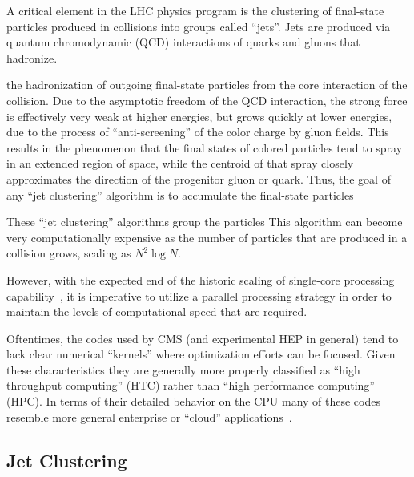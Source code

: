 \documentclass[12pt]{article}
\begin{document}
A critical element in the LHC physics program is the clustering of
final-state particles produced in collisions into groups called
``jets''. Jets are produced via quantum chromodynamic (QCD)
interactions of quarks and gluons that hadronize. 


the hadronization of outgoing final-state particles
from the core interaction of the collision. Due to the asymptotic
freedom of the QCD interaction, the strong force is effectively very
weak at higher energies, but grows quickly at lower energies, due to
the process of ``anti-screening'' of the color charge by gluon
fields. This results in the phenomenon that the final states of
colored particles tend to spray in an extended region of space, while
the centroid of that spray closely approximates the direction of the
progenitor gluon or quark. Thus, the goal of any ``jet clustering''
algorithm is to accumulate the final-state particles 


These ``jet clustering'' algorithms group the particles 
This algorithm can become very computationally expensive as the number
of particles that are produced in a collision grows, scaling as
$N^2\log{N}$. 


However, with the expected end of the historic scaling of single-core
processing capability~\cite{GAMEOVER}, it is imperative to utilize a
parallel processing
strategy in order to maintain the levels of computational speed that
are required.

Oftentimes,
the codes used by CMS (and experimental HEP in general) tend to lack
clear numerical ``kernels'' where optimization efforts can be focused. 
Given these characteristics they are generally more properly classified as
``high throughput computing'' (HTC) rather than ``high performance computing'' (HPC). 
In terms of their detailed behavior on the CPU many of these codes resemble
more general enterprise or ``cloud''
applications~\cite{CLOUDSUITE,GOODACHEP}.




 

\subsection{Jet Clustering} 
\end{document}
